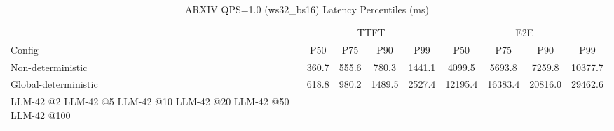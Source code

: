 \begin{table}[htbp]
\centering
\caption{ARXIV QPS=1.0 (ws32_bs16) Latency Percentiles (ms)}
\label{tab:arxiv_qps1.0_ws32_bs16}
\begin{tabular}{l|cccc|cccc}
\toprule
& \multicolumn{4}{c|}{TTFT} & \multicolumn{4}{c}{E2E} \\
Config & P50 & P75 & P90 & P99 & P50 & P75 & P90 & P99 \\
\midrule
Non-deterministic & 360.7 & 555.6 & 780.3 & 1441.1 & 4099.5 & 5693.8 & 7259.8 & 10377.7 \\
Global-deterministic & 618.8 & 980.2 & 1489.5 & 2527.4 & 12195.4 & 16383.4 & 20816.0 & 29462.6 \\
LLM-42 @2%
LLM-42 @5%
LLM-42 @10%
LLM-42 @20%
LLM-42 @50%
LLM-42 @100%
\bottomrule
\end{tabular}
\end{table}
